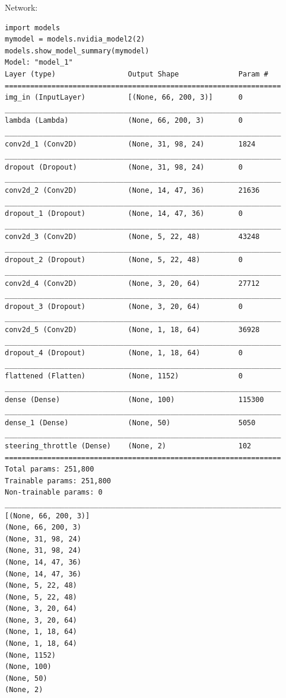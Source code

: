 Network:
\begin{verbatim}
import models
mymodel = models.nvidia_model2(2)
models.show_model_summary(mymodel)
Model: "model_1"
Layer (type)                 Output Shape              Param #   
=================================================================
img_in (InputLayer)          [(None, 66, 200, 3)]      0         
_________________________________________________________________
lambda (Lambda)              (None, 66, 200, 3)        0         
_________________________________________________________________
conv2d_1 (Conv2D)            (None, 31, 98, 24)        1824      
_________________________________________________________________
dropout (Dropout)            (None, 31, 98, 24)        0         
_________________________________________________________________
conv2d_2 (Conv2D)            (None, 14, 47, 36)        21636     
_________________________________________________________________
dropout_1 (Dropout)          (None, 14, 47, 36)        0         
_________________________________________________________________
conv2d_3 (Conv2D)            (None, 5, 22, 48)         43248     
_________________________________________________________________
dropout_2 (Dropout)          (None, 5, 22, 48)         0         
_________________________________________________________________
conv2d_4 (Conv2D)            (None, 3, 20, 64)         27712     
_________________________________________________________________
dropout_3 (Dropout)          (None, 3, 20, 64)         0         
_________________________________________________________________
conv2d_5 (Conv2D)            (None, 1, 18, 64)         36928     
_________________________________________________________________
dropout_4 (Dropout)          (None, 1, 18, 64)         0         
_________________________________________________________________
flattened (Flatten)          (None, 1152)              0         
_________________________________________________________________
dense (Dense)                (None, 100)               115300    
_________________________________________________________________
dense_1 (Dense)              (None, 50)                5050      
_________________________________________________________________
steering_throttle (Dense)    (None, 2)                 102       
=================================================================
Total params: 251,800
Trainable params: 251,800
Non-trainable params: 0
_________________________________________________________________
[(None, 66, 200, 3)]
(None, 66, 200, 3)
(None, 31, 98, 24)
(None, 31, 98, 24)
(None, 14, 47, 36)
(None, 14, 47, 36)
(None, 5, 22, 48)
(None, 5, 22, 48)
(None, 3, 20, 64)
(None, 3, 20, 64)
(None, 1, 18, 64)
(None, 1, 18, 64)
(None, 1152)
(None, 100)
(None, 50)
(None, 2)

\end{verbatim}

